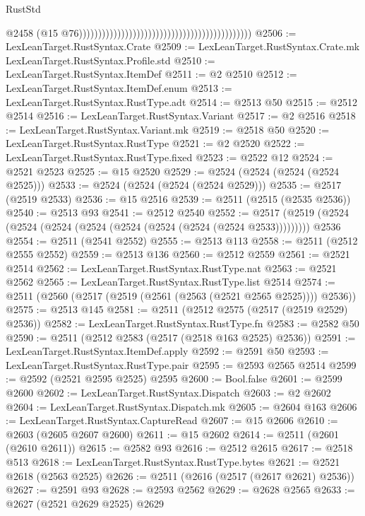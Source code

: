 \begin{lexlean}{RustStd}
\begin{coremodule}
                                                                                            @2458
                                                                                            (@15
                                                                                              @76)))))))))))))))))))))))))))))))))))))))))))))
@2506 := LexLeanTarget.RustSyntax.Crate
@2509 := LexLeanTarget.RustSyntax.Crate.mk LexLeanTarget.RustSyntax.Profile.std
@2510 := LexLeanTarget.RustSyntax.ItemDef
@2511 := @2 @2510
@2512 := LexLeanTarget.RustSyntax.ItemDef.enum
@2513 := LexLeanTarget.RustSyntax.RustType.adt
@2514 := @2513 @50
@2515 := @2512 @2514
@2516 := LexLeanTarget.RustSyntax.Variant
@2517 := @2 @2516
@2518 := LexLeanTarget.RustSyntax.Variant.mk
@2519 := @2518 @50
@2520 := LexLeanTarget.RustSyntax.RustType
@2521 := @2 @2520
@2522 := LexLeanTarget.RustSyntax.RustType.fixed
@2523 := @2522 @12
@2524 := @2521 @2523
@2525 := @15 @2520
@2529 := @2524 (@2524 (@2524 (@2524 @2525)))
@2533 := @2524 (@2524 (@2524 (@2524 @2529)))
@2535 := @2517 (@2519 @2533)
@2536 := @15 @2516
@2539 := @2511 (@2515 (@2535 @2536))
@2540 := @2513 @93
@2541 := @2512 @2540
@2552 := @2517 (@2519 (@2524 (@2524 (@2524 (@2524 (@2524 (@2524 (@2524 (@2524 @2533))))))))) @2536
@2554 := @2511 (@2541 @2552)
@2555 := @2513 @113
@2558 := @2511 (@2512 @2555 @2552)
@2559 := @2513 @136
@2560 := @2512 @2559
@2561 := @2521 @2514
@2562 := LexLeanTarget.RustSyntax.RustType.nat
@2563 := @2521 @2562
@2565 := LexLeanTarget.RustSyntax.RustType.list @2514
@2574 := @2511 (@2560 (@2517 (@2519 (@2561 (@2563 (@2521 @2565 @2525)))) @2536))
@2575 := @2513 @145
@2581 := @2511 (@2512 @2575 (@2517 (@2519 @2529) @2536))
@2582 := LexLeanTarget.RustSyntax.RustType.fn
@2583 := @2582 @50
@2590 := @2511 (@2512 @2583 (@2517 (@2518 @163 @2525) @2536))
@2591 := LexLeanTarget.RustSyntax.ItemDef.apply
@2592 := @2591 @50
@2593 := LexLeanTarget.RustSyntax.RustType.pair
@2595 := @2593 @2565 @2514
@2599 := @2592 (@2521 @2595 @2525) @2595
@2600 := Bool.false
@2601 := @2599 @2600
@2602 := LexLeanTarget.RustSyntax.Dispatch
@2603 := @2 @2602
@2604 := LexLeanTarget.RustSyntax.Dispatch.mk
@2605 := @2604 @163
@2606 := LexLeanTarget.RustSyntax.CaptureRead
@2607 := @15 @2606
@2610 := @2603 (@2605 @2607 @2600)
@2611 := @15 @2602
@2614 := @2511 (@2601 (@2610 @2611))
@2615 := @2582 @93
@2616 := @2512 @2615
@2617 := @2518 @513
@2618 := LexLeanTarget.RustSyntax.RustType.bytes
@2621 := @2521 @2618 (@2563 @2525)
@2626 := @2511 (@2616 (@2517 (@2617 @2621) @2536))
@2627 := @2591 @93
@2628 := @2593 @2562
@2629 := @2628 @2565
@2633 := @2627 (@2521 @2629 @2525) @2629

\end{coremodule}
\end{lexlean}
